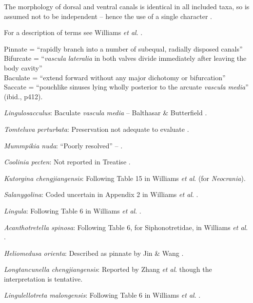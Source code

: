 \documentclass[openany]{book}
\theoremstyle{definition}
\theoremstyle{definition}
\theoremstyle{definition}
\theoremstyle{remark}
\begin{document}
The morphology of dorsal and ventral canals is identical in all included
taxa, so is assumed not to be independent -- hence the use of a single
character \citep[contra][]{Williams2000BrachiopodaLinguliformea}.

For a description of terms see Williams \emph{et al}.
\citeyearpar[2000]{Williams1997BrachiopodaRevised}.

Pinnate = ``rapidly branch into a number of subequal, radially disposed
canals''\\
Bifurcate = ``\emph{vascula} \emph{lateralia} in both valves divide
immediately after leaving the body cavity''\\
Baculate = ``extend forward without any major dichotomy or bifurcation''
\citep[ p.~418]{Williams1997BrachiopodaRevised}\\
Saccate = ``pouchlike sinuses lying wholly posterior to the arcuate
\emph{vascula} \emph{media}'' (ibid., p412).

\emph{Lingulosacculus}: Baculate \emph{vascula} \emph{media} --
Balthasar \& Butterfield \citeyearpar{Balthasar2009EarlyCambrian}.

\emph{Tomteluva perturbata}: Preservation not adequate to evaluate
\citep{Streng2016Anew}.

\emph{Mummpikia nuda}: ``Poorly resolved'' --
\citet{Balthasar2008iMummpikia}.

\emph{Coolinia pecten}: Not reported in Treatise
\citep{Williams2000BrachiopodaLinguliformea}.

\emph{Kutorgina chengjiangensis}: Following Table 15 in Williams
\emph{et al}. \citeyearpar{Williams2000BrachiopodaLinguliformea} (for
\emph{Neocrania}).

\emph{Salanygolina}: Coded uncertain in Appendix 2 in Williams \emph{et
al}. \citeyearpar{Williams1998Thediversity}.

\emph{Lingula}: Following Table 6 in Williams \emph{et al}.
\citeyearpar{Williams2000BrachiopodaLinguliformea}.

\emph{Acanthotretella spinosa}: Following Table 6, for Siphonotretidae,
in Williams \emph{et al}.
\citeyearpar{Williams2000BrachiopodaLinguliformea}.

\emph{Heliomedusa orienta}: Described as pinnate by Jin \& Wang
\citeyearpar{Jin1992Revisionof}.

\emph{Longtancunella chengjiangensis}: Reported by Zhang \emph{et al}.
\citeyearpar[2011T]{Zhang2007Agregarious} though the interpretation is
tentative.

\emph{Lingulellotreta malongensis}: Following Table 6 in Williams
\emph{et al}. \citeyearpar{Williams2000BrachiopodaLinguliformea}.
\end{document}
